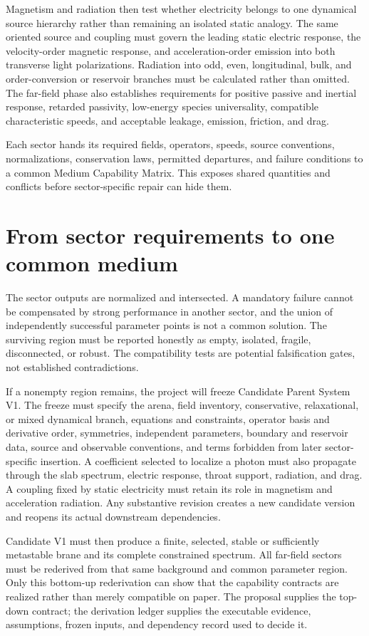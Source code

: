 Magnetism and radiation then test whether electricity belongs to one dynamical
source hierarchy rather than remaining an isolated static analogy. The same
oriented source and coupling must govern the leading static electric response, the
velocity-order magnetic response, and acceleration-order emission into both
transverse light polarizations. Radiation into odd, even, longitudinal, bulk, and
order-conversion or reservoir branches must be calculated rather than omitted. The
far-field phase also establishes requirements for positive passive and inertial
response, retarded passivity, low-energy species universality, compatible
characteristic speeds, and acceptable leakage, emission, friction, and drag.

Each sector hands its required fields, operators, speeds, source conventions,
normalizations, conservation laws, permitted departures, and failure conditions to
a common Medium Capability Matrix. This exposes shared quantities and conflicts
before sector-specific repair can hide them.

\section{From sector requirements to one common medium}

The sector outputs are normalized and intersected. A mandatory failure cannot be
compensated by strong performance in another sector, and the union of
independently successful parameter points is not a common solution. The surviving
region must be reported honestly as empty, isolated, fragile, disconnected, or
robust. The compatibility tests are potential falsification gates, not
established contradictions.

If a nonempty region remains, the project will freeze Candidate Parent System V1.
The freeze must specify the arena, field inventory, conservative, relaxational, or
mixed dynamical branch, equations and constraints, operator basis and derivative
order, symmetries, independent parameters, boundary and reservoir data, source and
observable conventions, and terms forbidden from later sector-specific insertion.
A coefficient selected to localize a photon must also propagate through the slab
spectrum, electric response, throat support, radiation, and drag. A coupling fixed
by static electricity must retain its role in magnetism and acceleration
radiation. Any substantive revision creates a new candidate version and reopens
its actual downstream dependencies.

Candidate V1 must then produce a finite, selected, stable or sufficiently
metastable brane and its complete constrained spectrum. All far-field sectors must
be rederived from that same background and common parameter region. Only this
bottom-up rederivation can show that the capability contracts are realized rather
than merely compatible on paper. The proposal supplies the top-down contract; the
derivation ledger supplies the executable evidence, assumptions, frozen inputs,
and dependency record used to decide it.

